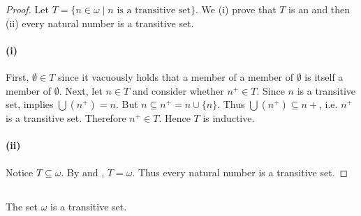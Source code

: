 \documentclass{report}
\begin{document}
\begin{proof}

  Let $T = \{n \in \omega \mid n \text{ is a transitive set}\}$.
  We (i) prove that $T$ is an  and then (ii) every
    natural number is a transitive set.

  \paragraph{(i)}%

    First, $\emptyset \in T$ since it vacuously holds that a member of a
      member of $\emptyset$ is itself a member of $\emptyset$.
    Next, let $n \in T$ and consider whether $n^+ \in T$.
    Since $n$ is a transitive set,  implies
      $\bigcup \left(n^+\right) = n$.
    But $n \subseteq n^+ = n \cup \{n\}$.
    Thus $\bigcup \left(n^+\right) \subseteq n+$, i.e. $n^+$ is a transitive
      set.
    Therefore $n^+ \in T$.
    Hence $T$ is inductive.

  \paragraph{(ii)}%

    Notice $T \subseteq \omega$.
    By  and , $T = \omega$.
    Thus every natural number is a transitive set.

\end{proof}

\subsection{}%

\begin{theorem}[4G]

  The set $\omega$ is a transitive set.

\end{theorem}
\end{document}

